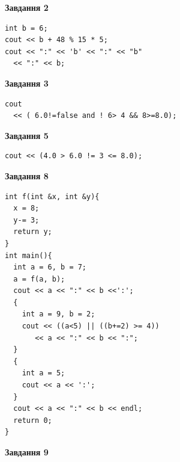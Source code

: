 \documentclass[12pt, ukrainian]{article}
\begin{document}
{\begin {large}
\begin{minipage}[t]{7.0cm}
\end{minipage}
\vline \hspace{1mm}
\begin{minipage}[t]{11.0cm}

\begin{center}
\textbf{Завдання 2}
\end{center}
\vspace{-8mm}

\begin{verbatim}
int b = 6;
cout << b + 48 % 15 * 5;
cout << ":" << 'b' << ":" << "b" 
  << ":" << b;
\end{verbatim}



\begin{center}
\textbf{Завдання 3}
\end{center}
\vspace{-8mm}

\begin{verbatim}
cout 
  << ( 6.0!=false and ! 6> 4 && 8>=8.0);
\end{verbatim}



\begin{center}
\textbf{Завдання 5}
\end{center}
\vspace{-8mm}

\begin{verbatim}
cout << (4.0 > 6.0 != 3 <= 8.0);
\end{verbatim}



\begin{center}
\textbf{Завдання 8}
\end{center}
\vspace{-8mm}

\begin{verbatim}
int f(int &x, int &y){
  x = 8;
  y-= 3;
  return y;
}
int main(){
  int a = 6, b = 7;
  a = f(a, b);
  cout << a << ":" << b <<':';
  {
    int a = 9, b = 2;
    cout << ((a<5) || ((b+=2) >= 4))
       << a << ":" << b << ":";
  }
  {
    int a = 5;
    cout << a << ':';
  }
  cout << a << ":" << b << endl;
  return 0;
}
\end{verbatim}

\end{minipage}


\begin{minipage}[t]{7.0cm}

\begin{center}
\textbf{Завдання 9}
\end{center}
\vspace{-8mm}


\end{minipage}
\end{large}}
\end{document}
